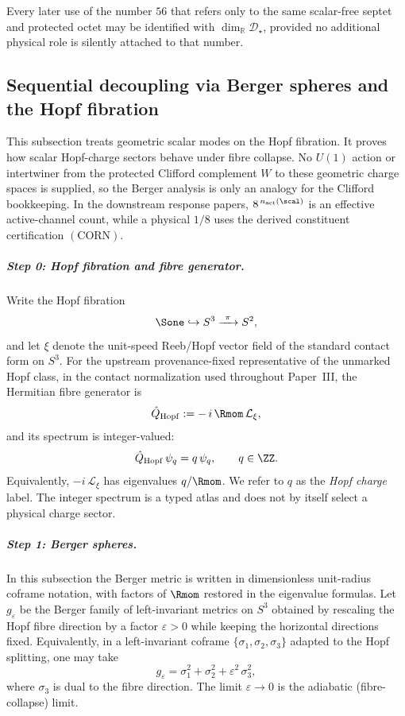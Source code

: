 \documentclass[11pt,a4paper]{article}
\begin{document}
\begin{corollary}
\label{p3:cor:master-support-synchronization}
Every later use of the number \(56\) that refers only to the same scalar-free
septet and protected octet may be identified with
\(\dim_{\mathbb R}\mathcal D_\star\), provided no additional physical role is
silently attached to that number.
\end{corollary}


\subsection{Sequential decoupling via Berger spheres and the Hopf fibration}
\label{p3:sec:decoupling}

This subsection treats geometric scalar modes on the Hopf fibration.  It proves
how scalar Hopf-charge sectors behave under fibre collapse.  No \(U(1)\) action or
intertwiner from the protected Clifford complement \(W\) to these geometric
charge spaces is supplied, so the Berger analysis is only an analogy for the
Clifford bookkeeping.  In the downstream response papers,
\(8^{\,n_{\rm act}(\scal)}\) is an effective active-channel count, while a
physical \(1/8\) uses the derived constituent certification
\((\mathrm{CORN})\).

\subparagraph{Step 0: Hopf fibration and fibre generator.}
Write the Hopf fibration
\[
\Sone \hookrightarrow S^3 \xrightarrow{\ \pi\ } S^2,
\]
and let $\xi$ denote the unit-speed Reeb/Hopf vector field of the standard contact form on $S^3$.
For the upstream provenance-fixed representative of the unmarked Hopf class, in the contact normalization used throughout Paper~III, the Hermitian fibre generator is
\[
\hat Q_{\rm Hopf}:=-\,i\,\Rmom\,\mathcal L_\xi,
\]
and its spectrum is integer-valued:
\[
\hat Q_{\rm Hopf}\,\psi_q = q\,\psi_q, \qquad q\in\ZZ.
\]
Equivalently, \(-i\,\mathcal L_\xi\) has eigenvalues \(q/\Rmom\). We refer to \(q\) as the \emph{Hopf charge} label.  The integer spectrum is a typed atlas and does not by itself select a physical charge sector.

\subparagraph{Step 1: Berger spheres.}
In this subsection the Berger metric is written in dimensionless unit-radius coframe notation, with factors of \(\Rmom\) restored in the eigenvalue formulas.  Let $g_\varepsilon$ be the Berger family of left-invariant metrics on $S^3$ obtained by
rescaling the Hopf fibre direction by a factor $\varepsilon>0$ while keeping the
horizontal directions fixed. Equivalently, in a left-invariant coframe
$\{\sigma_1,\sigma_2,\sigma_3\}$ adapted to the Hopf splitting, one may take
\[
g_\varepsilon = \sigma_1^2+\sigma_2^2+\varepsilon^2\,\sigma_3^2,
\]
where $\sigma_3$ is dual to the fibre direction. The limit $\varepsilon\to 0$ is the
adiabatic (fibre-collapse) limit.
\end{document}

